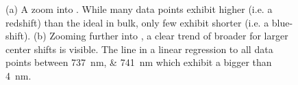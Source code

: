 		\begin{figure}[!htb]
			\begin{subfigure}{.5\textwidth}
				\centering
				\caption{}
				\label{subfig::distro_inset1}
			\end{subfigure}
			\begin{subfigure}{.5\textwidth}
				\centering
				\caption{}
				\label{subfig::distro_inset2}
			\end{subfigure}
			\caption[Zoom-in onto \sivs of the \vl]{(a) A zoom into \vl. While many data points exhibit higher \cwls (i.e. a redshift) than the ideal \siv in bulk, only few exhibit shorter \cwls (i.e. a blue-shift). (b) Zooming further into \vl, a clear trend of broader \ZPL \lws for larger \ZPL center shifts is visible. The line in a linear regression to all data points between \SIlist{737;741}{\nano\meter} which exhibit a \lw bigger than \SI{4}{\nano\meter}.}
			\label{fig::bimodal_distr_zoom}
		\end{figure}

